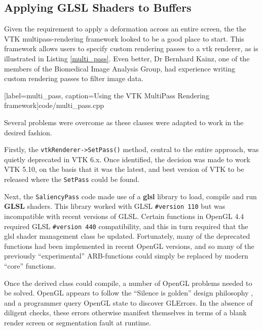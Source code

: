 \documentclass[MSc,paper=a4,pagesize=auto]{icldt}
\begin{document}
\subsection{Applying GLSL Shaders to Buffers}
Given the requirement to apply a deformation across an entire screen, the the VTK multipass-rendering framework looked to be a good place to start. This framework allows users to specify custom rendering passes to a vtk renderer, as is illustrated in Listing \ref{multi_pass}. Even better, Dr Bernhard Kainz, one of the members of the Biomedical Image Analysis Group, had experience writing custom rendering passes to filter image data.


  [label=multi_pass, caption=Using the VTK MultiPass Rendering framework]{code/multi_pass.cpp}

Several problems were overcome as these classes were adapted to work in the desired fashion.

Firstly, the \texttt{vtkRenderer->SetPass()} method, central to the entire approach, was quietly deprecated in VTK 6.x. Once identified,  the decision was made to work VTK 5.10, on the basis that it was the latest, and best version of VTK to be released where the \texttt{SetPass} could be found.

Next, the \texttt{SaliencyPass} code made use of a \textbf{glsl} library to load, compile and run \textbf{GLSL} shaders. This library worked with GLSL \texttt{\#version 110} but was incompatible with recent versions of GLSL. Certain functions in OpenGL 4.4 required GLSL \texttt{\#version 440} compatibility, and this in turn required that the glsl shader management class be updated. Fortunately, many of the deprecated functions had been implemented in recent OpenGL versions, and so many of the previously ``experimental'' ARB-functions could simply be replaced by modern ``core'' functions.


Once the derived class could compile, a number of OpenGL problems needed to be solved. OpenGL appears to follow the ``Silence is golden'' design philosophy \cite{the_art_of_unix_programming}, and a programmer query OpenGL state to discover GLErrors. In the absence of diligent checks, these errors otherwise manifest themselves in terms of a blank render screen or segmentation fault at runtime. 
\end{document}
